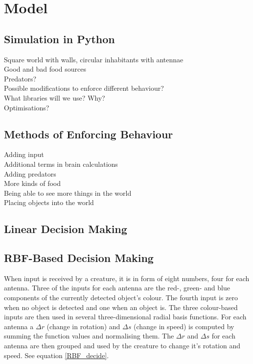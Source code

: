 \documentclass[a4paper,11pt]{kth-mag}
\begin{document}
\section{Model}
\subsection{Simulation in Python}
Square world with walls, circular inhabitants with antennae\\
Good and bad food sources\\
Predators?\\
Possible modifications to enforce different behaviour?\\
What libraries will we use? Why?\\
Optimisations?\\

\subsection{Methods of Enforcing Behaviour}
Adding input\\
Additional terms in brain calculations\\
Adding predators\\
More kinds of food\\
Being able to see more things in the world\\
Placing objects into the world\\
\subsection{Linear Decision Making}
\subsection{RBF-Based Decision Making}

When input is received by a creature, it is in form of eight numbers, four for each antenna. Three of the inputs for each antenna are the red-, green- and blue components of the currently detected object's colour. The fourth input is zero when no object is detected and one when an object is. The three colour-based inputs are then used in several three-dimensional radial basis functions. For each antenna a $\Delta r$ (change in rotation) and $\Delta s$ (change in speed) is computed by summing the function values and normalising them. The $\Delta r$ and $\Delta s$ for each antenna are then grouped and used by the creature to change it's rotation and speed. See equation \ref{RBF_decide}.
\end{document}
